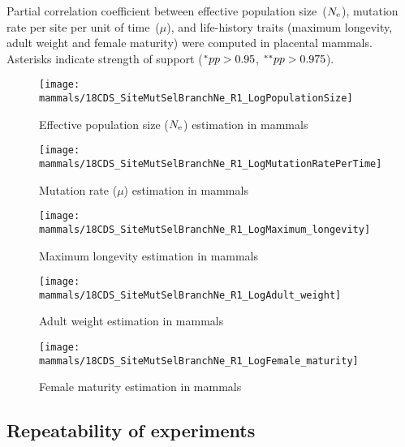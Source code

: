 \begin{table}[H]
    
    \caption[Partial correlation coefficient matrix in mammals]{
    Partial correlation coefficient between effective population size~($\Ne$), mutation rate per site per unit of time~($\mu$), and life-history traits (maximum longevity, adult weight and female maturity) were computed in placental mammals.
    Asterisks indicate strength of support ($\smash{^{*}} pp > 0.95$, $\smash{^{**}} pp > 0.975$).}
    \label{tab:table-partcor-mammals}
\end{table}

\begin{figure}[H]
    \centering
    \texttt{[image: mammals/18CDS\_SiteMutSelBranchNe\_R1\_LogPopulationSize]}
    \caption[$\Ne$ estimation in mammals]{Effective population size ($\Ne$) estimation in mammals}
\end{figure}

\begin{figure}[H]
    \centering
    \texttt{[image: mammals/18CDS\_SiteMutSelBranchNe\_R1\_LogMutationRatePerTime]}
    \caption[Mutation rate estimation in mammals]{Mutation rate ($\mu$) estimation in mammals}
\end{figure}

\begin{figure}[H]
    \centering
    \texttt{[image: mammals/18CDS\_SiteMutSelBranchNe\_R1\_LogMaximum\_longevity]}
    \caption[Maximum longevity estimation in mammals]{Maximum longevity estimation in mammals}
\end{figure}

\begin{figure}[H]
    \centering
    \texttt{[image: mammals/18CDS\_SiteMutSelBranchNe\_R1\_LogAdult\_weight]}
    \caption[Adult weight estimation in mammals]{Adult weight estimation in mammals}
\end{figure}

\begin{figure}[H]
    \centering
    \texttt{[image: mammals/18CDS\_SiteMutSelBranchNe\_R1\_LogFemale\_maturity]}
    \caption[Female maturity estimation in mammals]{Female maturity estimation in mammals}
\end{figure}

\subsection{Repeatability of experiments}
\label{subsec:repeatability-of-experiments-mammals}

